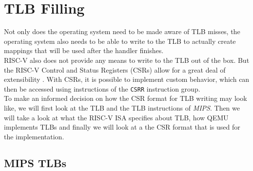 


\section{TLB Filling}
Not only does the operating system need to be made aware of TLB misses,
the operating system also needs to be able to write to the TLB to actually create
mappings that will be used after the handler finishes.\\
RISC-V also does not provide any means to write to the TLB out of the box. But the RISC-V Control and Status Registers
(CSRs) allow for a great deal of extensibility \cite{riscvreader}.
With CSRs, it is possible to implement custom behavior, which can then be accessed using instructions
of the \texttt{CSRR} instruction group.\\
To make an informed decision on how the CSR format for TLB writing may look like, we will first
look at the TLB and the TLB instructions of \emph{MIPS}. Then we will take a look at what the
RISC-V ISA specifies about TLB, how QEMU implements TLBs and finally we will look at a the
CSR format that is used for the implementation.

\subsection{MIPS TLBs}               %


